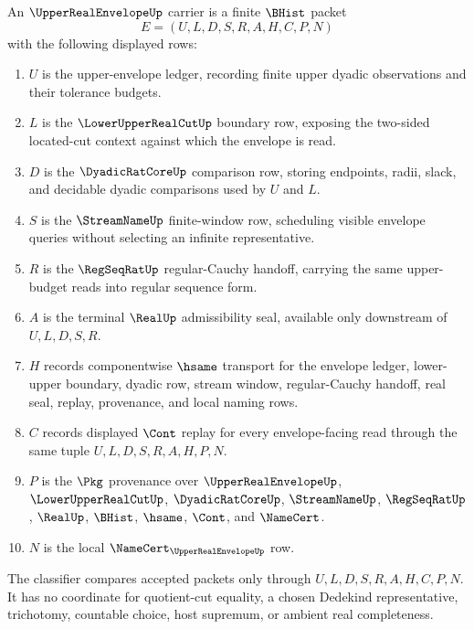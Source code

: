 \begin{definition}
\label{def:upper-real-envelope-carrier}
An $\UpperRealEnvelopeUp$ carrier is a finite $\BHist$ packet
$$
E=(U,L,D,S,R,A,H,C,P,N)
$$
with the following displayed rows:
\begin{enumerate}
\item $U$ is the upper-envelope ledger, recording finite upper dyadic observations and their tolerance budgets.
\item $L$ is the $\LowerUpperRealCutUp$ boundary row, exposing the two-sided located-cut context against which the envelope is read.
\item $D$ is the $\DyadicRatCoreUp$ comparison row, storing endpoints, radii, slack, and decidable dyadic comparisons used by $U$ and $L$.
\item $S$ is the $\StreamNameUp$ finite-window row, scheduling visible envelope queries without selecting an infinite representative.
\item $R$ is the $\RegSeqRatUp$ regular-Cauchy handoff, carrying the same upper-budget reads into regular sequence form.
\item $A$ is the terminal $\RealUp$ admissibility seal, available only downstream of $U,L,D,S,R$.
\item $H$ records componentwise $\hsame$ transport for the envelope ledger, lower-upper boundary, dyadic row, stream window, regular-Cauchy handoff, real seal, replay, provenance, and local naming rows.
\item $C$ records displayed $\Cont$ replay for every envelope-facing read through the same tuple $U,L,D,S,R,A,H,P,N$.
\item $P$ is the $\Pkg$ provenance over $\UpperRealEnvelopeUp$, $\LowerUpperRealCutUp$, $\DyadicRatCoreUp$, $\StreamNameUp$, $\RegSeqRatUp$, $\RealUp$, $\BHist$, $\hsame$, $\Cont$, and $\NameCert$.
\item $N$ is the local $\NameCert_{\UpperRealEnvelopeUp}$ row.
\end{enumerate}
The classifier compares accepted packets only through $U,L,D,S,R,A,H,C,P,N$. It has no coordinate for quotient-cut equality, a chosen Dedekind representative, trichotomy, countable choice, host supremum, or ambient real completeness.
\end{definition}

